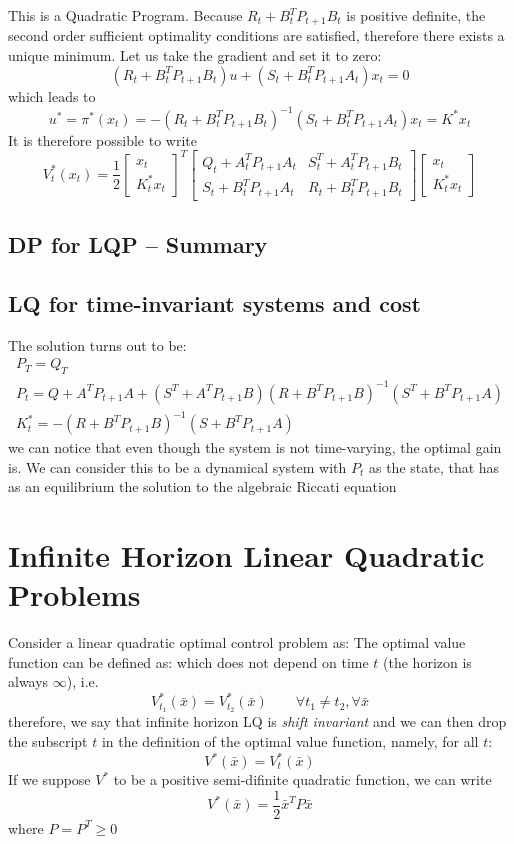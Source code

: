 \documentclass{book}
\theoremstyle{definition}
\theoremstyle{remark}
\theoremstyle{remark}
\begin{document}
This is a Quadratic Program. Because $R_t+B_t^TP_{t+1}B_t$ is positive definite, the second order sufficient optimality conditions are satisfied, therefore there exists a unique minimum. Let us take the gradient and set it to zero: 
\[
    (R_t+B_t^TP_{t+1}B_t)u + (S_t+B_t^T P_{t+1} A_t)x_t = 0
\]
which leads to 
\[
    u^* = \pi^*(x_t) = -(R_t+B_t^T P_{t+1} B_t )^{-1}(S_t + B_t^T P_{t+1} A_t)x_t = K^*x_t
\]
It is therefore possible to write 
\[
    V_t^*(x_t) = \frac{1}{2} \begin{bmatrix}
        x_t \\ K_t^* x_t
    \end{bmatrix}^T \begin{bmatrix}
    Q_t+A_t^T P_{t+1} A_t & S_t^T + A_t^T P_{t+1} B_t\\ 
    S_t + B_t^T P_{t+1} A_t & R_t + B_t^T P_{t+1} B_t
    \end{bmatrix} \begin{bmatrix}
        x_t \\ K_t^* x_t
    \end{bmatrix}
\]
\subsection{DP for LQP – Summary}

\subsection{LQ for time-invariant systems and cost}
The solution turns out to be: 
\begin{gather}
    P_T = Q_T \\ 
    P_t = Q + A^TP_{t+1}A + (S^T+A^TP_{t+1}B)(R+B^TP_{t+1}B)^{-1}(S^T+B^TP_{t+1}A)\\
    K_t^* = -(R+B^TP_{t+1}B)^{-1}(S+B^TP_{t+1}A)
\end{gather}
we can notice that even though the system is not time-varying, the optimal gain is. We can consider this to be a dynamical system with $P_t$ as the state, that has as an equilibrium the solution to the algebraic Riccati equation

\section{Infinite Horizon Linear Quadratic Problems}
Consider a linear quadratic optimal control problem as: 
The optimal value function can be defined as: 
which does not depend on time $t$ (the horizon is always $\infty$), i.e. 
\[
    V_{t_1}^*(\bar{x})=V_{t_2}^*(\bar{x}) \qquad \forall t_1\neq t_2, \forall \bar{x}
\]
therefore, we say that infinite horizon LQ is \emph{shift invariant} and we can then drop the subscript $t$ in the definition of the optimal value function, namely, for  all $t$: 
\[
    V^*(\bar{x}) = V^*_t(\bar{x})
\]
If we suppose $V^*$ to be a positive semi-difinite quadratic function, we can write 
\[
    V^*(\bar{x}) = \frac{1}{2} \bar{x}^T P\bar{x}
\]
where $P=P^T\geq 0$
\end{document}
